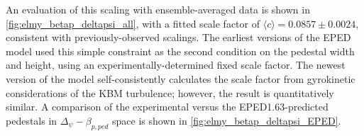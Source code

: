 An evaluation of this scaling with ensemble-averaged data is shown in \cref{fig:elmy_betap_deltapsi_all}, with a fitted scale factor of $\langle c \rangle = 0.0857 \pm 0.0024$, consistent with previously-observed scalings.  The earliest versions of the EPED model used this simple constraint as the second condition on the pedestal width and height, using an experimentally-determined fixed scale factor.  The newest version of the model self-consistently calculates the scale factor from gyrokinetic considerations of the KBM turbulence; however, the result is quantitatively similar.  A comparison of the experimental versus the EPED1.63-predicted pedestals in $\Delta_\psi - \beta_{p,ped}$ space is shown in \cref{fig:elmy_betap_deltapsi_EPED}.

\begin{figure}[ht]
 \pushtooutside
\end{figure}

